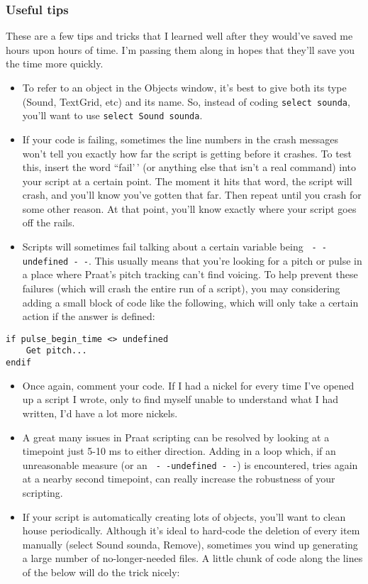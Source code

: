 \hypertarget{useful-tips}{%
\subsubsection{Useful tips}\label{useful-tips}}

\label{scriptingtips}

These are a few tips and tricks that I learned well after they would've
saved me hours upon hours of time. I'm passing them along in hopes that
they'll save you the time more quickly.

\begin{itemize}
\item
  To refer to an object in the Objects window, it's best to give both
  its type (Sound, TextGrid, etc) and its name. So, instead of coding
  \texttt{select sounda}, you'll want to use
  \texttt{select Sound sounda}.
\item
  If your code is failing, sometimes the line numbers in the crash
  messages won't tell you exactly how far the script is getting before
  it crashes. To test this, insert the word ``fail'\,' (or anything else
  that isn't a real command) into your script at a certain point. The
  moment it hits that word, the script will crash, and you'll know
  you've gotten that far. Then repeat until you crash for some other
  reason. At that point, you'll know exactly where your script goes off
  the rails.
\item
  Scripts will sometimes fail talking about a certain variable being
  \texttt{ - -undefined - -}. This usually means that you're looking for
  a pitch or pulse in a place where Praat's pitch tracking can't find
  voicing. To help prevent these failures (which will crash the entire
  run of a script), you may considering adding a small block of code
  like the following, which will only take a certain action if the
  answer is defined:
\end{itemize}

\begin{verbatim} 
if pulse_begin_time <> undefined
    Get pitch...
endif
\end{verbatim}

\begin{itemize}
\item
  Once again, comment your code. If I had a nickel for every time I've
  opened up a script I wrote, only to find myself unable to understand
  what I had written, I'd have a lot more nickels.
\item
  A great many issues in Praat scripting can be resolved by looking at a
  timepoint just 5-10 ms to either direction. Adding in a loop which, if
  an unreasonable measure (or an \texttt{ - -undefined - -}) is
  encountered, tries again at a nearby second timepoint, can really
  increase the robustness of your scripting.
\item
  If your script is automatically creating lots of objects, you'll want
  to clean house periodically. Although it's ideal to hard-code the
  deletion of every item manually (select Sound sounda, Remove),
  sometimes you wind up generating a large number of no-longer-needed
  files. A little chunk of code along the lines of the below will do the
  trick nicely:
\end{itemize}

